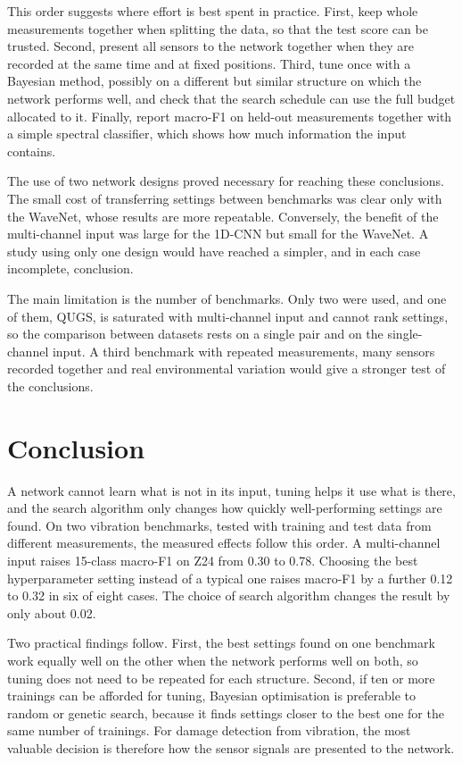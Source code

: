 \documentclass[11pt,a4paper]{article}
\begin{document}
This order suggests where effort is best spent in practice. First, keep whole measurements together when splitting the data, so that the test score can be trusted. Second, present all sensors to the network together when they are recorded at the same time and at fixed positions. Third, tune once with a Bayesian method, possibly on a different but similar structure on which the network performs well, and check that the search schedule can use the full budget allocated to it. Finally, report macro-F1 on held-out measurements together with a simple spectral classifier, which shows how much information the input contains.

The use of two network designs proved necessary for reaching these conclusions. The small cost of transferring settings between benchmarks was clear only with the WaveNet, whose results are more repeatable. Conversely, the benefit of the multi-channel input was large for the 1D-CNN but small for the WaveNet. A study using only one design would have reached a simpler, and in each case incomplete, conclusion.

The main limitation is the number of benchmarks. Only two were used, and one of them, QUGS, is saturated with multi-channel input and cannot rank settings, so the comparison between datasets rests on a single pair and on the single-channel input. A third benchmark with repeated measurements, many sensors recorded together and real environmental variation would give a stronger test of the conclusions.

\section{Conclusion}\label{sec:conclusion}

A network cannot learn what is not in its input, tuning helps it use what is there, and the search algorithm only changes how quickly well-performing settings are found. On two vibration benchmarks, tested with training and test data from different measurements, the measured effects follow this order. A multi-channel input raises 15-class macro-F1 on Z24 from 0.30 to 0.78. Choosing the best hyperparameter setting instead of a typical one raises macro-F1 by a further 0.12 to 0.32 in six of eight cases. The choice of search algorithm changes the result by only about 0.02.

Two practical findings follow. First, the best settings found on one benchmark work equally well on the other when the network performs well on both, so tuning does not need to be repeated for each structure. Second, if ten or more trainings can be afforded for tuning, Bayesian optimisation is preferable to random or genetic search, because it finds settings closer to the best one for the same number of trainings. For damage detection from vibration, the most valuable decision is therefore how the sensor signals are presented to the network.
\end{document}
